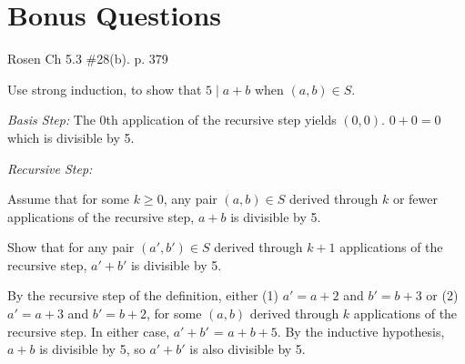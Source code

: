 \begin{questions}
\begin{solution}
    \end{solution}




\section*{Bonus Questions} 


\bonusquestion[4] Rosen Ch 5.3 \#28(b). p. 379

\begin{solution}
Use strong induction, to show that $5\;|\; a+b$ when $(a,b) \in S$.  

\textit{Basis Step:}  The 0th application of the recursive step yields $(0,0)$.  $0 + 0 = 0$ which is divisible by 5. 

\smallskip
\textit{Recursive Step:} 

Assume that for some $k \geq 0$, any pair $(a,b) \in S$ derived through $k$ or fewer applications of the recursive step, $a + b$ is divisible by 5. 

Show that for any pair $(a' , b' ) \in S$ derived through $k + 1$ applications of the recursive step, $a' + b'$ is divisible by 5. 

By the recursive step of the definition, either (1) $a' = a+2$ and $b' = b+3$ or (2) $a' = a+3$ and $b' = b+2$, for some $(a, b)$ derived through $k$ applications of the recursive step. In either case, $a' + b'$ = $a + b + 5$.  By the inductive hypothesis, $a + b$ is divisible by 5, so $a' + b'$ is also divisible by 5.


\end{solution}
\end{questions}
